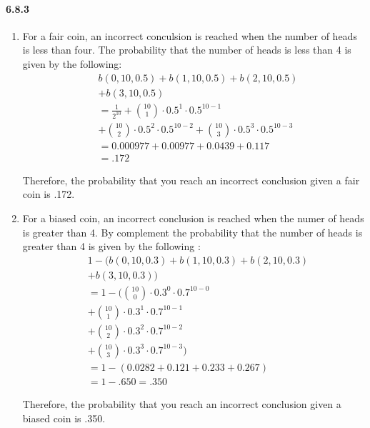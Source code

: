 \documentclass[11pt, letterpaper, twocolumn, fleqn]{article}
\begin{document}
\paragraph{6.8.3}
\begin{enumerate}
  \item For a fair coin, an incorrect conculsion is reached when the number of heads is less than four. The probability that the number of heads is less than 4 is given by the following:
  \begin{align*}
    &b(0,10,0.5) + b(1,10,0.5) + b(2,10,0.5) \\
    &+ b(3,10,0.5) \\
    &= \frac{1}{2^{10}} + \binom{10}{1}\cdot0.5^1\cdot0.5^{10-1} \\
    &+ \binom{10}{2}\cdot0.5^2\cdot0.5^{10-2} + \binom{10}{3}\cdot0.5^3\cdot0.5^{10-3}\\
    &= 0.000977 + 0.00977 + 0.0439 + 0.117 \\
    &= .172
  \end{align*}

  Therefore, the probability that you reach an incorrect conclusion given a fair coin is .172.
  
  \item For a biased coin, an incorrect conclusion is reached when the numer of heads is greater than 4. By complement the probability that the number of heads is greater than 4 is given by the following :
  \begin{align*}
    &1 - (b(0,10,0.3) + b(1,10,0.3) + b(2,10,0.3) \\
    &+ b(3,10,0.3)) \\
    &= 1 - \bigg(\binom{10}{0}\cdot0.3^0\cdot0.7^{10-0} \\
    &+ \binom{10}{1}\cdot0.3^1\cdot0.7^{10-1} \\ 
    &+ \binom{10}{2}\cdot0.3^2\cdot0.7^{10-2} \\
    &+ \binom{10}{3}\cdot0.3^3\cdot0.7^{10-3} \bigg) \\
    &= 1 - (0.0282 + 0.121 + 0.233 + 0.267) \\
    &= 1 - .650 = .350
  \end{align*}

  Therefore, the probability that you reach an incorrect conclusion given a biased coin is .350.
\end{enumerate}
\end{document}
